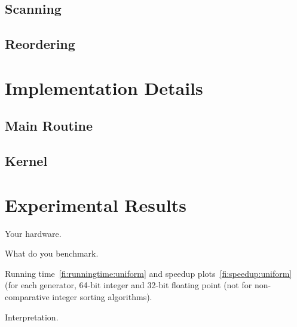 \documentclass{llncs}
\begin{document}




\subsection{Scanning}

\subsection{Reordering}

\section{Implementation Details}

\subsection{Main Routine}

\subsection{Kernel}

\section{Experimental Results}

Your hardware.

What do you benchmark.

Running time~\ref{fi:runningtime:uniform} and speedup plots~\ref{fi:speedup:uniform} (for each generator, 64-bit integer and 32-bit floating point (not for  non-comparative integer sorting algorithms).

Interpretation.
\end{document}

